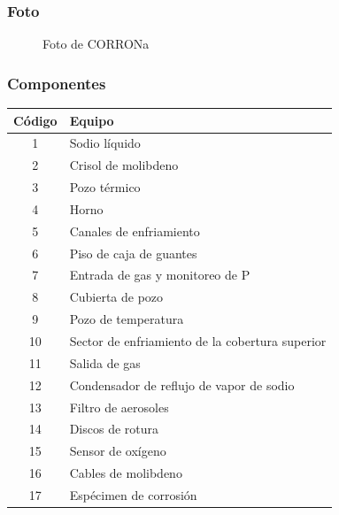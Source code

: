 \documentclass{article}
\begin{document}
\subsubsection*{Foto}
\begin{figure}[H]
\begin{center}
\end{center}
\caption{Foto de CORRONa}
\end{figure}
\subsubsection*{Componentes}
\begin{table}[H]
\centering
\begin{tabular}{cp{4cm}}
\toprule
Código & Equipo \\
\midrule
1 & Sodio líquido \\
2 & Crisol de molibdeno \\
3 & Pozo térmico \\
4 & Horno \\
5 & Canales de \newline enfriamiento \\
6 & Piso de caja de guantes \\
7 & Entrada de gas y \newline monitoreo de P \\
8 & Cubierta de pozo \\
9 & Pozo de temperatura \\
10 & Sector de enfriamiento de la cobertura superior \\
11 & Salida de gas \\
12 & Condensador de reflujo de vapor de sodio \\
13 & Filtro de aerosoles \\
14 & Discos de rotura \\
15 & Sensor de oxígeno \\
16 & Cables de molibdeno \\
17 & Espécimen de \newline corrosión \\
\bottomrule
\end{tabular}
\end{table}
\end{document}
